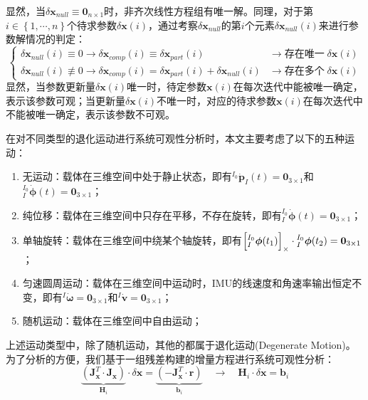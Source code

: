 显然，当$\delta\boldsymbol{x}_{null}
  \equiv\boldsymbol{0}_{n\times 1}$时，非齐次线性方程组有唯一解。同理，对于第$i\in\left\lbrace 1,\cdots,n\right\rbrace $个待求参数$\delta\boldsymbol{x}(i)$，通过考察$\delta\boldsymbol{x}_{null}$的第$i$个元素$\delta\boldsymbol{x}_{null}(i)$来进行参数解情况的判定：
\begin{equation}
  \begin{cases}
    \delta\boldsymbol{x}_{null}(i)\equiv 0\to \delta\boldsymbol{x}_{comp}(i)\equiv\delta\boldsymbol{x}_{part}(i)                              & \to\mbox{存在唯一}\;\delta\boldsymbol{x}(i) \\
    \delta\boldsymbol{x}_{null}(i)\not\equiv 0\to\delta\boldsymbol{x}_{comp}(i)=\delta\boldsymbol{x}_{part}(i)+\delta\boldsymbol{x}_{null}(i) & \to\mbox{存在多个}\;\delta\boldsymbol{x}(i)
  \end{cases}
\end{equation}
显然，当参数更新量$\delta\boldsymbol{x}(i)$唯一时，待定参数$\boldsymbol{x}(i)$在每次迭代中能被唯一确定，表示该参数可观；当更新量$\delta\boldsymbol{x}(i)$不唯一时，对应的待求参数$\boldsymbol{x}(i)$在每次迭代中不能被唯一确定，表示该参数不可观。

在对不同类型的退化运动进行系统可观性分析时，本文主要考虑了以下的五种运动：
\begin{enumerate}
  \item 无运动：载体在三维空间中处于静止状态，即有${^{I_0}\dot{\boldsymbol{p}}_{I}(t)}=\boldsymbol{0}_{3\times 1}$和${^{I_0}_{I}\dot{\boldsymbol{\phi}}(t)}=\boldsymbol{0}_{3\times 1}$；
  \item 纯位移：载体在三维空间中只存在平移，不存在旋转，即有${^{I_0}_{I}\dot{\boldsymbol{\phi}}(t)}=\boldsymbol{0}_{3\times 1}$；
  \item 单轴旋转：载体在三维空间中绕某个轴旋转，即有$\left[ {^{I_0}_{I}{\boldsymbol{\phi}}(t_1)} \right]_\times\cdot{^{I_0}_{I}{\boldsymbol{\phi}}(t_2)}=\boldsymbol{0}_{3\times 1}$；
  \item 匀速圆周运动：载体在三维空间中运动时，IMU的线速度和角速率输出恒定不变，即有${^{I}\dot{\boldsymbol{\omega}}}=\boldsymbol{0}_{3\times 1}$和${^{I}\dot{\boldsymbol{v}}}=\boldsymbol{0}_{3\times 1}$；
  \item 随机运动：载体在三维空间中自由运动；
\end{enumerate}
上述运动类型中，除了随机运动，其他的都属于退化运动(Degenerate Motion)。为了分析的方便，我们基于一组残差构建的增量方程进行系统可观性分析：
\begin{equation}
  \underbrace{\left(
    \boldsymbol{J}_{\boldsymbol{x}}^T\cdot\boldsymbol{J}_{\boldsymbol{x}}
    \right)}_{\boldsymbol{H}_i}
  \cdot\delta\boldsymbol{x}=
  \underbrace{\left( - \boldsymbol{J}_{\boldsymbol{x}}^T\cdot\boldsymbol{r}\right)}
  _{\boldsymbol{b}_i}
  \quad\to\quad
  \boldsymbol{H}_i\cdot\delta\boldsymbol{x}=\boldsymbol{b}_i
\end{equation}

